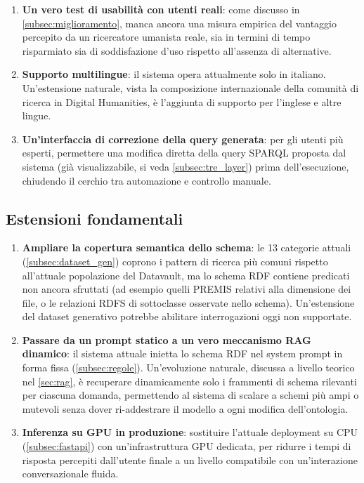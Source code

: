 \documentclass[12pt,a4paper,oneside]{book}
\begin{document}
\begin{enumerate}
    \item \textbf{Un vero test di usabilità con utenti reali}: come discusso in \cref{subsec:miglioramento}, manca ancora una misura empirica del vantaggio percepito da un ricercatore umanista reale, sia in termini di tempo risparmiato sia di soddisfazione d'uso rispetto all'assenza di alternative.
    \item \textbf{Supporto multilingue}: il sistema opera attualmente solo in italiano. Un'estensione naturale, vista la composizione internazionale della comunità di ricerca in Digital Humanities, è l'aggiunta di supporto per l'inglese e altre lingue.
    \item \textbf{Un'interfaccia di correzione della query generata}: per gli utenti più esperti, permettere una modifica diretta della query SPARQL proposta dal sistema (già visualizzabile, si veda \cref{subsec:tre_layer}) prima dell'esecuzione, chiudendo il cerchio tra automazione e controllo manuale.
\end{enumerate}

\subsection{Estensioni fondamentali}\label{subsec:estensioni_fondamentali}

\begin{enumerate}
    \item \textbf{Ampliare la copertura semantica dello schema}: le 13 categorie attuali (\cref{subsec:dataset_gen}) coprono i pattern di ricerca più comuni rispetto all'attuale popolazione del Datavault, ma lo schema RDF contiene predicati non ancora sfruttati (ad esempio quelli PREMIS relativi alla dimensione dei file, o le relazioni RDFS di sottoclasse osservate nello schema). Un'estensione del dataset generativo potrebbe abilitare interrogazioni oggi non supportate.
    \item \textbf{Passare da un prompt statico a un vero meccanismo RAG dinamico}: il sistema attuale inietta lo schema RDF nel system prompt in forma fissa (\cref{subsec:regole}). Un'evoluzione naturale, discussa a livello teorico nel \cref{sec:rag}, è recuperare dinamicamente solo i frammenti di schema rilevanti per ciascuna domanda, permettendo al sistema di scalare a schemi più ampi o mutevoli senza dover ri-addestrare il modello a ogni modifica dell'ontologia.
    \item \textbf{Inferenza su GPU in produzione}: sostituire l'attuale deployment su CPU (\cref{subsec:fastapi}) con un'infrastruttura GPU dedicata, per ridurre i tempi di risposta percepiti dall'utente finale a un livello compatibile con un'interazione conversazionale fluida.
\end{enumerate}
\end{document}

